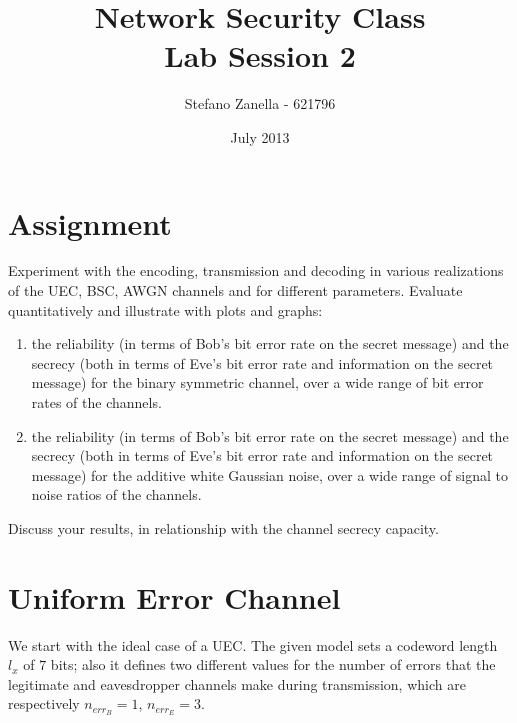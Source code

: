 \documentclass[a4paper,12pt,titlepage]{article}
\begin{document}
\title{Network Security Class \\ Lab Session 2}
\author{Stefano Zanella - 621796}
\date{July 2013}

\maketitle

\section{Assignment}
Experiment with the encoding, transmission and decoding in various realizations
of the UEC, BSC, AWGN channels and for different parameters. Evaluate
quantitatively and illustrate with plots and graphs:

\begin{enumerate}
  \item the reliability (in terms of Bob's bit error rate on the secret message) and
        the secrecy (both in terms of Eve's bit error rate and information on the
        secret message) for the binary symmetric channel, over a wide range of bit
        error rates of the channels.

  \item the reliability (in terms of Bob's bit error rate on the secret message) and
        the secrecy (both in terms of Eve's bit error rate and information on the
        secret message) for the additive white Gaussian noise, over a wide range of
        signal to noise ratios of the channels.
\end{enumerate}

Discuss your results, in relationship with the channel secrecy capacity.

\newpage

\section{Uniform Error Channel}

We start with the ideal case of a UEC. The given model sets a codeword length
$l_x$ of $7$ bits; also it defines two different values for the number of
errors that the legitimate and eavesdropper channels make during transmission,
which are respectively $n_{err_B} = 1$, $n_{err_E} = 3$.
\end{document}
